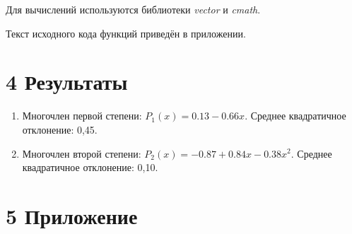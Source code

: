 \documentclass[14pt,a4paper]{extarticle}
\begin{document}
	Для вычислений используются библиотеки \textit{vector} и \textit{cmath}. 
	
	Текст исходного кода функций приведён в приложении.
	
	\section*{4 Результаты}
	\begin{enumerate}
		\item Многочлен первой степени: $P_1(x) = 0.13 - 0.66x$. Среднее квадратичное отклонение: 0,45.
		\item Многочлен второй степени: $P_2(x) = -0.87 + 0.84x - 0.38x^2$. Среднее квадратичное отклонение: 0,10.
	\end{enumerate}
	
	\section*{5 Приложение}
	
\end{document}
